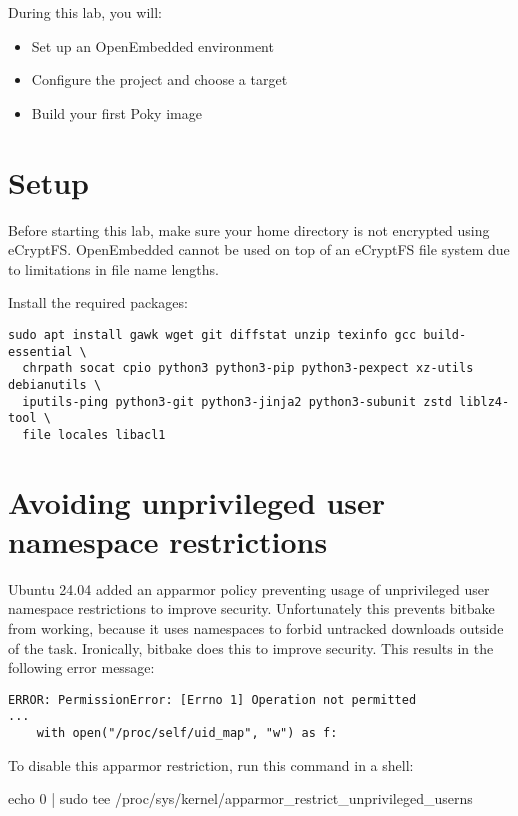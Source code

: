 
During this lab, you will:
\begin{itemize}
  \item Set up an OpenEmbedded environment
  \item Configure the project and choose a target
  \item Build your first Poky image
\end{itemize}

\section{Setup}

Before starting this lab, make sure your home directory is not
encrypted using eCryptFS. OpenEmbedded cannot be used on top of an eCryptFS file
system due to limitations in file name lengths.

Install the required packages:
\begin{verbatim}
sudo apt install gawk wget git diffstat unzip texinfo gcc build-essential \
  chrpath socat cpio python3 python3-pip python3-pexpect xz-utils debianutils \
  iputils-ping python3-git python3-jinja2 python3-subunit zstd liblz4-tool \
  file locales libacl1
\end{verbatim}

\section{Avoiding unprivileged user namespace restrictions}

Ubuntu 24.04 added an apparmor policy preventing usage of unprivileged user
namespace restrictions to improve security. Unfortunately this prevents
bitbake from working, because it uses namespaces to forbid untracked
downloads outside of the \code{do_fetch} task. Ironically, bitbake does
this to improve security. This results in the following error message:

\begin{verbatim}
ERROR: PermissionError: [Errno 1] Operation not permitted
...
    with open("/proc/self/uid_map", "w") as f:
\end{verbatim}

To disable this apparmor restriction, run this command in a shell:

\begin{bashinput}
echo 0 | sudo tee /proc/sys/kernel/apparmor_restrict_unprivileged_userns
\end{bashinput}

